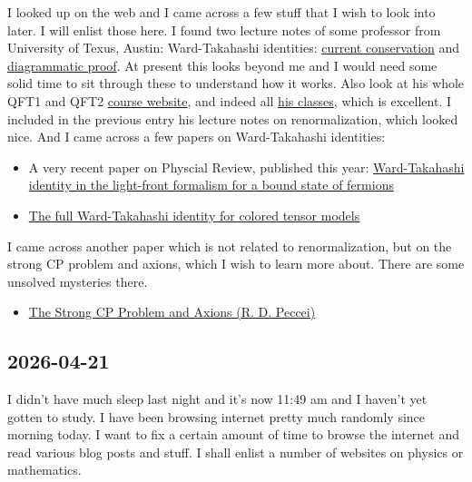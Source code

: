 \documentclass[11pt,a4paper]{article}
\begin{document}
I looked up on the web and I came across a few stuff that I wish to look into later. I will enlist those here. I found two lecture notes of some professor from University of Texus, Austin: Ward-Takahashi identities: \href{https://web2.ph.utexas.edu/~vadim/Classes/2024f-qft/WTI1.pdf}{current conservation} and \href{https://web2.ph.utexas.edu/~vadim/Classes/2024f-qft/WTI2.pdf}{diagrammatic proof}. At present this looks beyond me and I would need some solid time to sit through these to understand how it works. Also look at his whole QFT1 and QFT2 \href{https://web2.ph.utexas.edu/~vadim/Classes/2024f-qft/notes.html}{course website}, and indeed all \href{https://web2.ph.utexas.edu/~vadim/class_pages.html}{his classes}, which is excellent. I included in the previous entry his lecture notes on renormalization, which looked nice. And I came across a few papers on Ward-Takahashi identities: 
\begin{itemize}
	\item A very recent paper on Physcial Review, published this year: \href{https://journals.aps.org/prd/abstract/10.1103/jm5x-7d83}{Ward-Takahashi identity in the light-front formalism for a bound state of fermions}
	\item \href{https://arxiv.org/pdf/1608.08134}{The full Ward-Takahashi identity for colored tensor models}
\end{itemize}

I came across another paper which is not related to renormalization, but on the strong CP problem and axions, which I wish to learn more about. There are some unsolved mysteries there. 
\begin{itemize}
	\item \href{https://arxiv.org/pdf/hep-ph/0607268}{The Strong CP Problem and Axions (R. D. Peccei)}
\end{itemize}



\subsection{2026-04-21}
I didn't have much sleep last night and it's now 11:49 am and I haven't yet gotten to study. I have been browsing internet pretty much randomly since morning today. I want to fix a certain amount of time to browse the internet and read various blog posts and stuff. I shall enlist a number of websites on physics or mathematics. 
\end{document}
